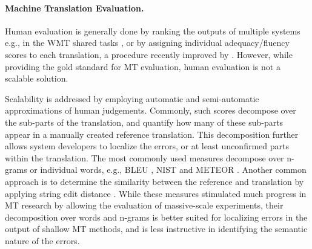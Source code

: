 \documentclass[11pt]{article}
\begin{document}
\paragraph{Machine Translation Evaluation.}
Human evaluation is generally done by ranking the outputs of multiple systems
e.g., in the WMT shared tasks \cite{bojar2015findings}, or by assigning
individual adequacy/fluency scores to each translation, a procedure recently improved
by .
However, while providing the gold standard for MT evaluation, human evaluation
is not a scalable solution.

Scalability is addressed by employing automatic and semi-automatic approximations of human
judgements. Commonly, such scores decompose over the sub-parts of
the translation, and quantify how many of these sub-parts appear in a manually created reference translation.
This decomposition further allows system developers
to localize the errors, or at least unconfirmed parts within the translation.
The most commonly used measures decompose over n-grams or individual words, e.g., 
BLEU \cite{Papineni:2002}, NIST \cite{Doddington:2002} and METEOR  \cite{Banerjee:2005}.
Another common approach is to determine the similarity between the reference and translation
by applying string edit distance \cite{snover2006study}.
While these measures stimulated much progress in MT research by allowing
the evaluation of massive-scale experiments,
their decomposition over words and n-grams is better suited for localizing errors
in the output of shallow MT methods, and is less instructive in identifying the semantic
nature of the errors. 

\end{document}
